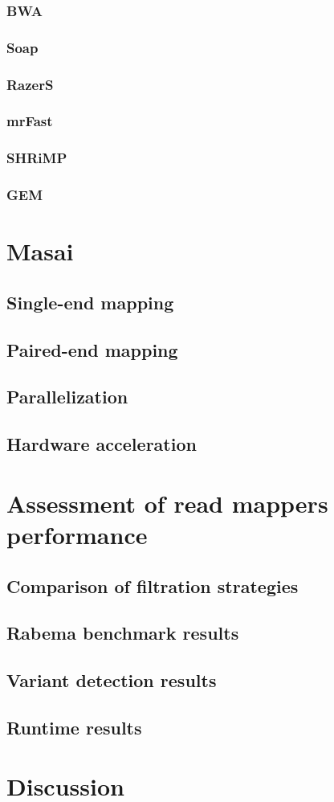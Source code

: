 \subsubsection{BWA}

\subsubsection{Soap}

\subsubsection{RazerS}

\subsubsection{mrFast}

\subsubsection{SHRiMP}

\subsubsection{GEM}

\section{Masai}
\subsection{Single-end mapping}
\subsection{Paired-end mapping}
\subsection{Parallelization}
\subsection{Hardware acceleration}

\section{Assessment of read mappers performance}
\subsection{Comparison of filtration strategies}
\subsection{Rabema benchmark results}
\subsection{Variant detection results}
\subsection{Runtime results}
\section{Discussion}